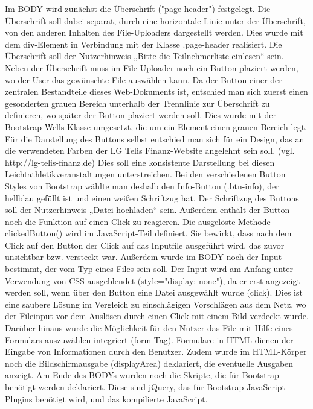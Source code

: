 {Im BODY wird zunächst die Überschrift ("page-header") festgelegt. Die Überschrift soll dabei separat, durch eine horizontale Linie unter der Überschrift, von den anderen Inhalten des File-Uploaders dargestellt werden. Dies wurde mit dem div-Element in Verbindung mit der Klasse .page-header realisiert. Die Überschrift soll der Nutzerhinweis „Bitte die Teilnehmerliste einlesen“ sein.
Neben der Überschrift muss im File-Uploader noch ein Button plaziert werden, wo der User das gewünschte File auswählen kann. Da der Button einer der zentralen Bestandteile dieses Web-Dokuments ist, entschied man sich zuerst einen gesonderten grauen Bereich unterhalb der Trennlinie zur Überschrift zu definieren, wo später der Button plaziert werden soll. Dies wurde mit der Bootstrap Wells-Klasse umgesetzt, die um ein Element einen grauen Bereich legt. 
Für die Darstellung des Buttons selbst entschied man sich für ein Design, das an die verwendeten Farben der LG Telis Finanz-Website angelehnt sein soll. (vgl. http://lg-telis-finanz.de)  Dies soll eine konsistente Darstellung bei diesen Leichtathletikveranstaltungen unterstreichen. Bei den verschiedenen Button Styles von Bootstrap wählte man deshalb den Info-Button (.btn-info), der hellblau gefüllt ist und einen weißen Schriftzug hat. Der Schriftzug des Buttons soll der Nutzerhinweis „Datei hochladen“ sein. Außerdem enthält der Button noch die Funktion auf einen Click zu reagieren. Die ausgelöste Methode clickedButton() wird im JavaScript-Teil definiert. Sie bewirkt, dass nach dem Click auf den Button der Click auf das Inputfile ausgeführt wird, das zuvor unsichtbar bzw. versteckt war.
Außerdem wurde im BODY noch der Input bestimmt, der vom Typ eines Files sein soll. Der Input wird am Anfang unter Verwendung von CSS ausgeblendet (style="display: none"), da er erst angezeigt werden soll, wenn über den Button eine Datei ausgewählt wurde (click). Dies ist eine saubere Lösung im Vergleich zu einschlägigen Vorschlägen aus dem Netz, wo der Fileinput vor dem Auslösen durch einen Click mit einem Bild verdeckt wurde.
Darüber hinaus wurde die Möglichkeit für den Nutzer das File mit Hilfe eines Formulars auszuwählen integriert (form-Tag). Formulare in HTML dienen der Eingabe von Informationen durch den Benutzer. Zudem wurde im HTML-Körper noch die Bildschirmausgabe (displayArea) deklariert, die eventuelle Ausgaben anzeigt. 
Am Ende des BODYs wurden noch die Skripte, die für Bootstrap benötigt werden deklariert. Diese sind jQuery, das für Bootstrap JavaScript-Plugins benötigt wird, und das kompilierte JavaScript.  

}

